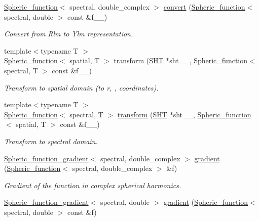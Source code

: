 \begin{DoxyCompactItemize}
\hyperlink{classsirius_1_1_spheric__function}{Spheric\+\_\+function}$<$ spectral, double\+\_\+complex $>$ \hyperlink{namespacesirius_adf8beb89969dce5d21e4a4562f060f2c}{convert} (\hyperlink{classsirius_1_1_spheric__function}{Spheric\+\_\+function}$<$ spectral, double $>$ const \&f\+\_\+\+\_\+)
\begin{DoxyCompactList}\small\item\em Convert from Rlm to Ylm representation. \end{DoxyCompactList}\item 
{\footnotesize template$<$typename T $>$ }\\\hyperlink{classsirius_1_1_spheric__function}{Spheric\+\_\+function}$<$ spatial, T $>$ \hyperlink{namespacesirius_a1ee2c8d52be6c7dea1b15c087a430390}{transform} (\hyperlink{classsirius_1_1_s_h_t}{S\+H\+T} $\ast$sht\+\_\+\+\_\+, \hyperlink{classsirius_1_1_spheric__function}{Spheric\+\_\+function}$<$ spectral, T $>$ const \&f\+\_\+\+\_\+)
\begin{DoxyCompactList}\small\item\em Transform to spatial domain (to r, ,  coordinates). \end{DoxyCompactList}\item 
{\footnotesize template$<$typename T $>$ }\\\hyperlink{classsirius_1_1_spheric__function}{Spheric\+\_\+function}$<$ spectral, T $>$ \hyperlink{namespacesirius_a53bdfb52b0e124845dbe3ffa74fb2861}{transform} (\hyperlink{classsirius_1_1_s_h_t}{S\+H\+T} $\ast$sht\+\_\+\+\_\+, \hyperlink{classsirius_1_1_spheric__function}{Spheric\+\_\+function}$<$ spatial, T $>$ const \&f\+\_\+\+\_\+)
\begin{DoxyCompactList}\small\item\em Transform to spectral domain. \end{DoxyCompactList}\item 
\hyperlink{classsirius_1_1_spheric__function__gradient}{Spheric\+\_\+function\+\_\+gradient}$<$ spectral, double\+\_\+complex $>$ \hyperlink{namespacesirius_a013f8e2567ba1436de57d8dac6e5fcb6}{gradient} (\hyperlink{classsirius_1_1_spheric__function}{Spheric\+\_\+function}$<$ spectral, double\+\_\+complex $>$ \&f)
\begin{DoxyCompactList}\small\item\em Gradient of the function in complex spherical harmonics. \end{DoxyCompactList}\item 
\hyperlink{classsirius_1_1_spheric__function__gradient}{Spheric\+\_\+function\+\_\+gradient}$<$ spectral, double $>$ \hyperlink{namespacesirius_a96ee05a0de7e4dd3ef150b267fd702bb}{gradient} (\hyperlink{classsirius_1_1_spheric__function}{Spheric\+\_\+function}$<$ spectral, double $>$ const \&f)

\end{DoxyCompactItemize}
